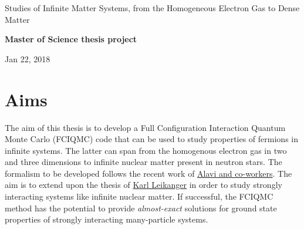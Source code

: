 \documentclass[%
oneside,                 %
final,                   %
10pt]{article}
\begin{document}

\newcommand{\exercisesection}[1]{\subsection*{#1}}






\thispagestyle{empty}

\begin{center}
{\LARGE\bf
\begin{spacing}{1.25}
Studies of Infinite Matter Systems, from the Homogeneous Electron Gas to Dense Matter 
\end{spacing}
}
\end{center}


\begin{center}
{\bf Master of Science thesis project${}^{}$} \\ [0mm]
\end{center}

\begin{center}
\end{center}
    

\begin{center}
Jan 22, 2018
\end{center}

\vspace{1cm}


\section{Aims}

The aim of this thesis is to develop a Full Configuration Interaction Quantum Monte Carlo (FCIQMC)
code that can be used to study properties of fermions in infinite systems. The latter can span from 
the homogenous electron gas in two and three dimensions to infinite nuclear matter present in neutron stars. 
The formalism to be developed follows the recent work of \href{{http://www.nature.com/nature/journal/v493/n7432/full/nature11770.html}}{Alavi and co-workers}. The aim is to extend upon the thesis of \href{{https://www.duo.uio.no/handle/10852/37172}}{Karl Leikanger} in order to study strongly interacting systems like infinite nuclear matter.  If successful, the FCIQMC method has the potential to provide \emph{almost-exact} solutions for ground state properties of strongly interacting many-particle systems. 
\end{document}
